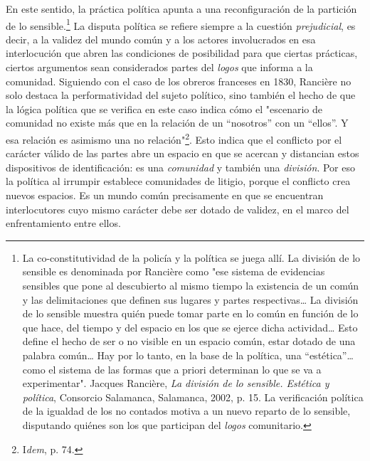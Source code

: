 En este sentido, la práctica política apunta a una reconfiguración de la
partición de lo sensible.\footnote{La co-constitutividad de la policía y
  la política se juega allí. La división de lo sensible es denominada
  por Rancière como "ese sistema de evidencias sensibles que pone al
  descubierto al mismo tiempo la existencia de un común y las
  delimitaciones que definen sus lugares y partes respectivas\ldots{} La
  división de lo sensible muestra quién puede tomar parte en lo común en
  función de lo que hace, del tiempo y del espacio en los que se ejerce
  dicha actividad\ldots{} Esto define el hecho de ser o no visible en un
  espacio común, estar dotado de una palabra común\ldots{} Hay por lo
  tanto, en la base de la política, una ``estética''\ldots{} como el
  sistema de las formas que a priori determinan lo que se va a
  experimentar". Jacques Rancière, \emph{La división de lo sensible.
  Estética y política}, Consorcio Salamanca, Salamanca, 2002, p. 15. La
  verificación política de la igualdad de los no contados motiva a un
  nuevo reparto de lo sensible, disputando quiénes son los que
  participan del \emph{logos} comunitario.} La disputa política se
refiere siempre a la cuestión \emph{prejudicial}, es decir, a la validez
del mundo común y a los actores involucrados en esa interlocución que
abren las condiciones de posibilidad para que ciertas prácticas, ciertos
argumentos sean considerados partes del \emph{logos} que informa a la
comunidad. Siguiendo con el caso de los obreros franceses en 1830,
Rancière no solo destaca la performatividad del sujeto político, sino
también el hecho de que la lógica política que se verifica en este caso
indica cómo el "escenario de comunidad no existe más que en la relación
de un ``nosotros'' con un ``ellos''. Y esa relación es asimismo una no
relación"\footnote{I\emph{dem}, p. 74.}. Esto indica que el conflicto
por el carácter válido de las partes abre un espacio en que se acercan y
distancian estos dispositivos de identificación: es una \emph{comunidad}
y también una \emph{división}. Por eso la política al irrumpir establece
comunidades de litigio, porque el conflicto crea nuevos espacios. Es un
mundo común precisamente en que se encuentran interlocutores cuyo mismo
carácter debe ser dotado de validez, en el marco del enfrentamiento
entre ellos.

